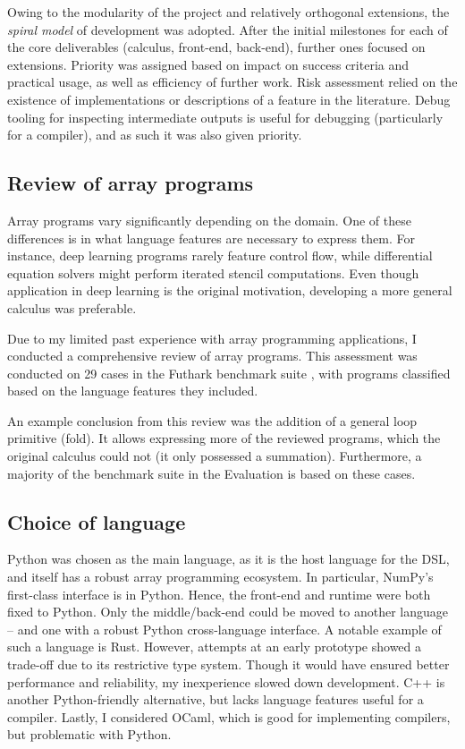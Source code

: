 Owing to the modularity of the project and relatively orthogonal extensions, the \textit{spiral model} of development was adopted. After the initial milestones for each of the core deliverables (calculus, front-end, back-end), further ones focused on extensions. Priority was assigned based on impact on success criteria and practical usage, as well as efficiency of further work. Risk assessment relied on the existence of implementations or descriptions of a feature in the literature. Debug tooling for inspecting intermediate outputs is useful for debugging (particularly for a compiler), and as such it was also given priority.

\subsection{Review of array programs}
\label{suite-review}

Array programs vary significantly depending on the domain. One of these differences is in what language features are necessary to express them. For instance, deep learning programs rarely feature control flow, while differential equation solvers might perform iterated stencil computations. Even though application in deep learning is the original motivation, developing a more general calculus was preferable.

Due to my limited past experience with array programming applications, I conducted a comprehensive review of array programs. This assessment was conducted on 29 cases in the Futhark benchmark suite \cite{The_Futhark_Hackers_futhark-benchmarks}, with programs classified based on the language features they included.

An example conclusion from this review was the addition of a general loop primitive (fold). It allows expressing more of the reviewed programs, which the original calculus could not (it only possessed a summation). 
Furthermore, a majority of the benchmark suite in the Evaluation is based on these cases. 

\subsection{Choice of language}

Python was chosen as the main language, as it is the host language for the DSL, and itself has a robust array programming ecosystem. 
In particular, NumPy's first-class interface is in Python. 
Hence, the front-end and runtime were both fixed to Python. 
Only the middle/back-end could be moved to another language -- and one with a robust Python cross-language interface. A notable example of such a language is Rust. However, attempts at an early prototype showed a trade-off due to its restrictive type system. Though it would have ensured better performance and reliability, my inexperience slowed down development. C++ is another Python-friendly alternative, but lacks language features useful for a compiler. Lastly, I considered OCaml, which is good for implementing compilers, but problematic with Python. 

